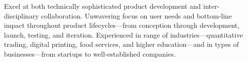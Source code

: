 

\begin{cvparagraph}

Excel at both technically sophisticated product development and inter-disciplinary
collaboration. Unwavering focus on user needs and bottom-line impact throughout
product lifecycles—from conception through development, launch, testing, and
iteration. Experienced in range of industries—quantitative trading, digital
printing, food services, and higher education—and in types of businesses—from
startups to well-established companies.
\end{cvparagraph}
